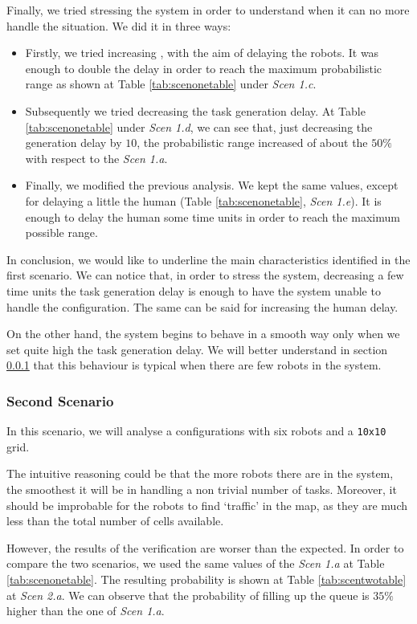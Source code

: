 Finally, we tried stressing the system in order to understand when it can no more handle the situation. We did it in three ways:
\begin{itemize}
    \item Firstly, we tried increasing \K, with the aim of delaying the robots. It was enough to double the delay in order to reach the maximum probabilistic range as shown at Table \ref{tab:scenonetable} under \emph{Scen 1.c}.
    \item Subsequently we tried decreasing the task generation delay. At Table \ref{tab:scenonetable} under \emph{Scen 1.d}, we can see that, just decreasing the generation delay by $10$, the probabilistic range increased of about the $50\%$ with respect to the \emph{Scen 1.a}.
    \item Finally, we modified the previous analysis. We kept the same values, except for delaying a little the human (Table \ref{tab:scenonetable}, \emph{Scen 1.e}). It is enough to delay the human some time units in order to reach the maximum possible range.
\end{itemize}

In conclusion, we would like to underline the main characteristics identified in the first scenario. We can notice that, in order to stress the system, decreasing a few time units the task generation delay is enough to have the system unable to handle the configuration. The same can be said for increasing the human delay.

On the other hand, the system begins to behave in a smooth way only when we set quite high the task generation delay. We will better understand in section \ref{secondscenario} that this behaviour is typical when there are few robots in the system.

\subsubsection{Second Scenario} \label{secondscenario}
In this scenario, we will analyse a configurations with six robots and a \texttt{10x10} grid.

The intuitive reasoning could be that the more robots there are in the system, the smoothest it will be in handling a non trivial number of tasks. Moreover, it should be improbable for the robots to find `traffic' in the map, as they are much less than the total number of cells available.

However, the results of the verification are worser than the expected. In order to compare the two scenarios, we used the same values of the \emph{Scen 1.a} at Table \ref{tab:scenonetable}. The resulting probability is shown at Table \ref{tab:scentwotable} at \emph{Scen 2.a}. We can observe that the probability of filling up the queue is $35\%$ higher than the one of \emph{Scen 1.a}.
\\

